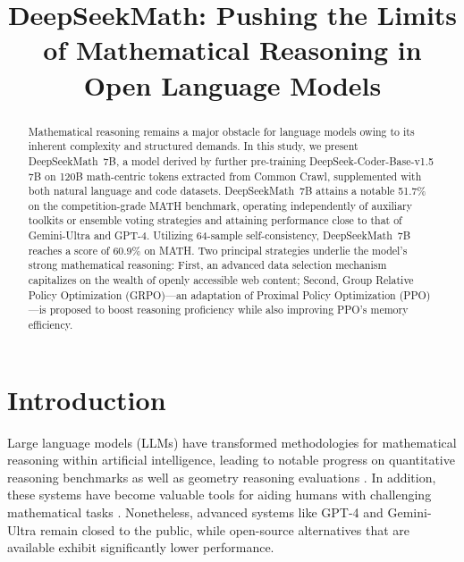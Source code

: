 \title{DeepSeekMath: Pushing the Limits of Mathematical Reasoning in Open Language Models}

\begin{abstract}
Mathematical reasoning remains a major obstacle for language models owing to its inherent complexity and structured demands. In this study, we present DeepSeekMath~7B, a model derived by further pre-training DeepSeek-Coder-Base-v1.5 7B on 120B math-centric tokens extracted from Common Crawl, supplemented with both natural language and code datasets. DeepSeekMath~7B attains a notable 51.7\% on the competition-grade MATH benchmark, operating independently of auxiliary toolkits or ensemble voting strategies and attaining performance close to that of Gemini-Ultra and GPT-4. Utilizing 64-sample self-consistency, DeepSeekMath~7B reaches a score of 60.9\% on MATH. Two principal strategies underlie the model’s strong mathematical reasoning: First, an advanced data selection mechanism capitalizes on the wealth of openly accessible web content; Second, Group Relative Policy Optimization (GRPO)—an adaptation of Proximal Policy Optimization (PPO)—is proposed to boost reasoning proficiency while also improving PPO’s memory efficiency.
\end{abstract}

\section{Introduction}

Large language models (LLMs) have transformed methodologies for mathematical reasoning within artificial intelligence, leading to notable progress on quantitative reasoning benchmarks \citep{MATH} as well as geometry reasoning evaluations \citep{trinh2024solving}. In addition, these systems have become valuable tools for aiding humans with challenging mathematical tasks \citep{tao}. Nonetheless, advanced systems like GPT-4 \citep{gpt4} and Gemini-Ultra \citep{gemini} remain closed to the public, while open-source alternatives that are available exhibit significantly lower performance.

